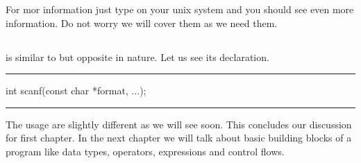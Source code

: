 For mor information just type  on your unix system and you
should see even more information. Do not worry we will cover them as we need
them.
\subsection{}
 is similar to  but opposite in nature. Let us see
its declaration.
{
\blank[force,1mm]\hrule\blank[force,1mm]
\startCPP
int scanf(const char *format, ...);
\stopCPP
\hrule
}
The usage are slightly different as we will see soon. This concludes our
discussion for first chapter. In the next chapter we will talk about basic
building blocks of a program like data types, operators, expressions and
control flows.

